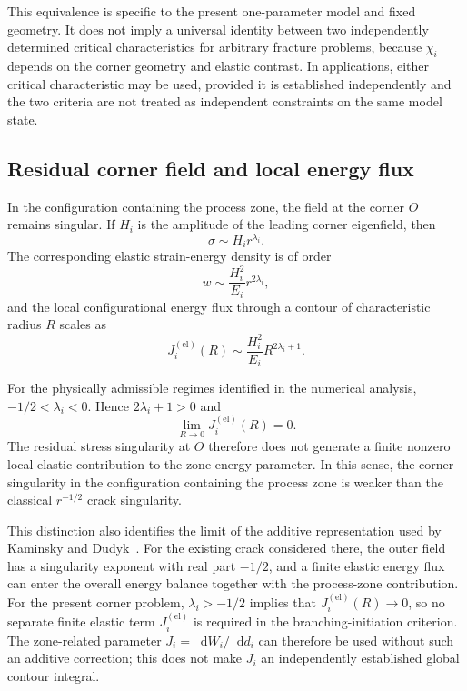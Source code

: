 \documentclass[pdflatex,onecolumn,sn-mathphys-ay]{sn-jnl}
\newcommand{\dd}{\mathop{}\!\mathrm{d}}
\begin{document}
This equivalence is specific to the present one-parameter model and fixed
geometry. It does not imply a universal identity between two independently
determined critical characteristics for arbitrary fracture problems, because
$\chi_i$ depends on the corner geometry and elastic contrast. In
applications, either critical characteristic may be used, provided it is
established independently and the two criteria are not treated as
independent constraints on the same model state.

\subsection{Residual corner field and local energy flux}
\label{subsec:discussion-flux}

In the configuration containing the process zone, the field at the corner
$O$ remains singular. If $H_i$ is the amplitude of the leading corner
eigenfield, then
\begin{equation*}
  \sigma\sim H_i r^{\lambda_i}.
\end{equation*}
The corresponding elastic strain-energy density is of order
\begin{equation*}
  w\sim\frac{H_i^2}{E_i}r^{2\lambda_i},
\end{equation*}
and the local configurational energy flux through a contour of
characteristic radius $R$ scales as
\begin{equation}
\label{eq:local-elastic-flux-scaling}
  J_i^{(\mathrm{el})}(R)
  \sim\frac{H_i^2}{E_i}R^{2\lambda_i+1}.
\end{equation}

For the physically admissible regimes identified in the numerical
analysis, $-1/2<\lambda_i<0$. Hence $2\lambda_i+1>0$ and
\begin{equation*}
  \lim_{R\to0}J_i^{(\mathrm{el})}(R)=0.
\end{equation*}
The residual stress singularity at $O$ therefore does not generate a
finite nonzero local elastic contribution to the zone energy parameter.
In this sense, the corner singularity in the configuration containing the
process zone is weaker than the classical $r^{-1/2}$ crack singularity.

This distinction also identifies the limit of the additive representation
used by Kaminsky and Dudyk~\citeyearpar{KaminskyDudyk2026Criteria}. For the
existing crack considered there, the outer field has a singularity exponent
with real part $-1/2$, and a finite elastic energy flux can enter the overall energy
balance together with the process-zone contribution. For the present
corner problem, $\lambda_i>-1/2$ implies that
$J_i^{(\mathrm{el})}(R)\to0$, so no separate finite elastic term
$J_i^{(\mathrm{el})}$ is required in the branching-initiation criterion. The zone-related parameter
$J_i=\dd W_i/\dd d_i$ can therefore be used without such an additive
correction; this does not make $J_i$ an independently established global
contour integral.
\end{document}
